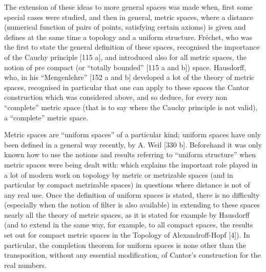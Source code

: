 The extension of these ideas to more general spaces was made when, first some special cases were studied, and then in general, metric spaces, where a distance (numerical function of pairs of points, satisfying certain axioms) is given and defines at the same time a topology and a uniform structure. Fréchet, who was the first to state the general definition of these spaces, recognised the importance of the Cauchy principle {[}115 a{]}, and introduced also for all metric spaces, the notion of pre compact (or ``totally bounded'' {[}115 a and b{]}) space. Hausdorff, who, in his ``Mengenlehre'' {[}152 a and b{]} developed a lot of the theory of metric spaces, recognised in particular that one can apply to these spaces the Cantor construction which was considered above, and so deduce, for every non ``complete'' metric space (that is to say where the Cauchy principle is not valid), a ``complete'' metric space.

Metric spaces are ``uniform spaces'' of a particular kind; uniform spaces have only been defined in a general way recently, by A. Weil {[}330 b{]}. Beforehand it was only known how to use the notions and results referring to ``uniform structure'' when metric spaces were being dealt with: which explains the important role played in a lot of modern work on topology by metric or metrizable spaces (and in particular by compact metrizable spaces) in questions where distance is not of any real use. Once the definition of uniform spaces is stated, there is no difficulty (especially when the notion of filter is also available) in extending to these spaces nearly all the theory of metric spaces, as it is stated for example by Hausdorff (and to extend in the same way, for example, to all compact spaces, the results set out for compact metric spaces in the Topology of Alexandroff-Hopf {[}4{]}). In particular, the completion theorem for uniform spaces is none other than the transposition, without any essential modification, of Cantor's construction for the real numbers.

